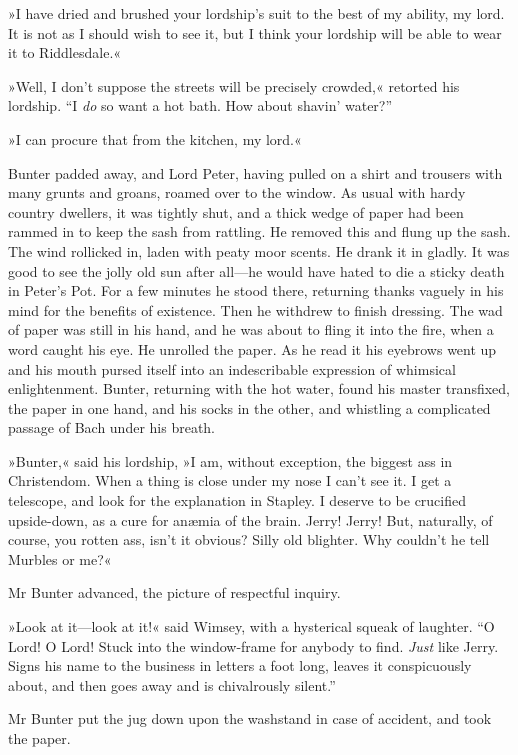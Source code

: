»I have dried and brushed your lordship's suit to the best of my ability, my lord. It is not as I should wish to see it, but I think your lordship will be able to wear it to Riddlesdale.«

»Well, I don't suppose the streets will be precisely crowded,« retorted his lordship. \enquote{I \textit{do} so want a hot bath. How about shavin' water?}

»I can procure that from the kitchen, my lord.«

Bunter padded away, and Lord Peter, having pulled on a shirt and trousers with many grunts and groans, roamed over to the window. As usual with hardy country dwellers, it was tightly shut, and a thick wedge of paper had been rammed in to keep the sash from rattling. He removed this and flung up the sash. The wind rollicked in, laden with peaty moor scents. He drank it in gladly. It was good to see the jolly old sun after all—he would have hated to die a sticky death in Peter's Pot. For a few minutes he stood there, returning thanks vaguely in his mind for the benefits of existence. Then he withdrew to finish dressing. The wad of paper was still in his hand, and he was about to fling it into the fire, when a word caught his eye. He unrolled the paper. As he read it his eyebrows went up and his mouth pursed itself into an indescribable expression of whimsical enlightenment. Bunter, returning with the hot water, found his master transfixed, the paper in one hand, and his socks in the other, and whistling a complicated passage of Bach under his breath.

»Bunter,« said his lordship, »I am, without exception, the biggest ass in Christendom. When a thing is close under my nose I can't see it. I get a telescope, and look for the explanation in Stapley. I deserve to be crucified upside-down, as a cure for anæmia of the brain. Jerry!  Jerry! But, naturally, of course, you rotten ass, isn't it obvious?  Silly old blighter. Why couldn't he tell Murbles or me?«

Mr Bunter advanced, the picture of respectful inquiry.

»Look at it—look at it!« said Wimsey, with a hysterical squeak of laughter. \enquote{O Lord! O Lord! Stuck into the window-frame for anybody to find. \textit{Just} like Jerry. Signs his name to the business in letters a foot long, leaves it conspicuously about, and then goes away and is chivalrously silent.}

Mr Bunter put the jug down upon the washstand in case of accident, and took the paper.

